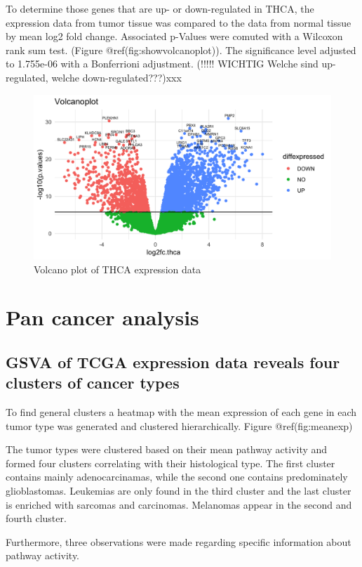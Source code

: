\documentclass[
  parskip,
  oneside]{scrreprt}
\begin{document}
To determine those genes that are up- or down-regulated in THCA, the
expression data from tumor tissue was compared to the data from normal
tissue by mean log2 fold change. Associated p-Values were comuted with a
Wilcoxon rank sum test. (Figure @ref(fig:showvolcanoplot)). The
significance level adjusted to 1.755e-06 with a Bonferrioni adjustment.
(!!!!! WICHTIG Welche sind up-regulated, welche down-regulated???)xxx

\begin{figure}

{\centering \includegraphics[width=0.3\linewidth]{figures/Volcanoplot} 

}

\caption{Volcano plot of THCA expression data}\label{fig:showvolcanoplot}
\end{figure}

\hypertarget{pan-cancer-analysis-1}{%
\section{Pan cancer analysis}\label{pan-cancer-analysis-1}}

\hypertarget{gsva-of-tcga-expression-data-reveals-four-clusters-of-cancer-types}{%
\subsection{GSVA of TCGA expression data reveals four clusters of cancer
types}\label{gsva-of-tcga-expression-data-reveals-four-clusters-of-cancer-types}}

To find general clusters a heatmap with the mean expression of each gene
in each tumor type was generated and clustered hierarchically. Figure
@ref(fig:meanexp)

The tumor types were clustered based on their mean pathway activity and
formed four clusters correlating with their histological type. The first
cluster contains mainly adenocarcinamas, while the second one contains
predominately glioblastomas. Leukemias are only found in the third
cluster and the last cluster is enriched with sarcomas and carcinomas.
Melanomas appear in the second and fourth cluster.

Furthermore, three observations were made regarding specific information
about pathway activity.
\end{document}
